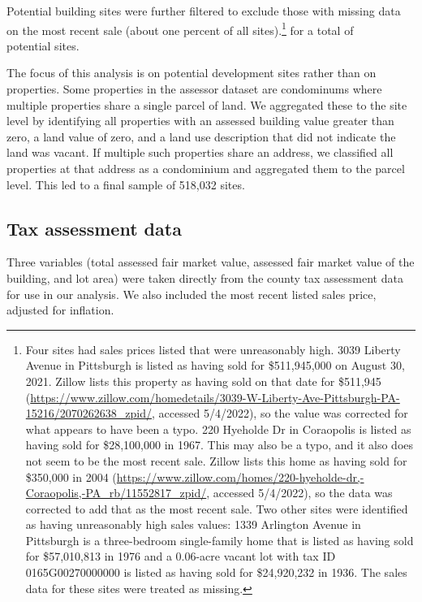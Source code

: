 \documentclass[
]{book}
\begin{document}
Potential building sites were further filtered to exclude those with missing data
on the most recent sale (about one percent of all sites).\footnote{Four sites had sales
  prices listed that were unreasonably high. 3039 Liberty Avenue in Pittsburgh is
  listed as having sold for \$511,945,000 on August 30, 2021. Zillow lists this
  property as having sold on that date for \$511,945
  (\url{https://www.zillow.com/homedetails/3039-W-Liberty-Ave-Pittsburgh-PA-15216/2070262638_zpid/}, accessed 5/4/2022),
  so the value was corrected for what appears to have been a typo. 220 Hyeholde Dr
  in Coraopolis is listed as having sold for \$28,100,000 in 1967. This may also
  be a typo, and it also does not seem to be the most recent sale. Zillow lists
  this home as having sold for \$350,000 in 2004
  (\url{https://www.zillow.com/homes/220-hyeholde-dr,-Coraopolis,-PA_rb/11552817_zpid/},
  accessed 5/4/2022), so the data was corrected to add that as the most recent sale.
  Two other sites were identified as having unreasonably high sales values: 1339
  Arlington Avenue in Pittsburgh is a three-bedroom single-family home that is
  listed as having sold for \$57,010,813 in 1976 and a 0.06-acre vacant lot with
  tax ID 0165G00270000000 is listed as having sold for \$24,920,232 in 1936. The
  sales data for these sites were treated as missing.} for a total of\\
potential sites.

The focus of this analysis is on potential development sites rather than on
properties. Some properties in the assessor dataset are condominums where
multiple properties share a single parcel of land. We aggregated these to the
site level by identifying all properties with an assessed building value
greater than zero, a land value of zero, and a land use description that did
not indicate the land was vacant. If multiple such properties share an address,
we classified all properties at that address as a condominium and aggregated
them to the parcel level. This led to a final sample of 518,032 sites.

\hypertarget{tax-assessment-data}{%
\subsection{Tax assessment data}\label{tax-assessment-data}}

Three variables (total assessed fair market value, assessed fair market value of the building, and lot area) were taken directly from the county tax assessment data for use in our analysis. We also included the most recent listed sales price, adjusted for inflation.
\end{document}
